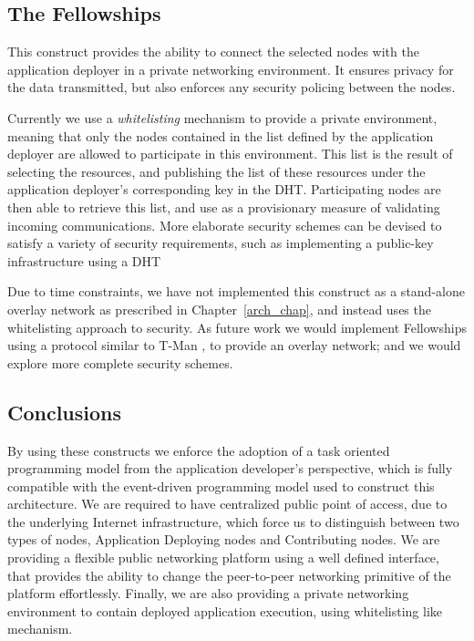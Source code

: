 \documentclass[12pt, titlepage]{uo_temp}
\begin{document}
     \subsection{The Fellowships}
     This construct provides the ability to connect the selected nodes
     with the application deployer in a private networking environment. It ensures privacy
     for the data transmitted, but also enforces any security policing between the nodes. 

     Currently we use a \emph{whitelisting} mechanism to provide a private environment,
     meaning that only the nodes contained in the list defined by the application deployer
     are allowed to participate in this environment. This list is the result of selecting
     the resources, and publishing the list of these resources under the application
     deployer's corresponding key in the DHT.
     Participating nodes are then able to retrieve this list, and use as a provisionary
     measure of validating incoming communications. More elaborate security schemes can be
     devised to satisfy a variety of security requirements, such as implementing a public-key
     infrastructure using a DHT \cite{luo2011self}
     
     Due to time constraints, we have not implemented this construct as a stand-alone
     overlay network as prescribed in Chapter~\ref{arch_chap}, and instead uses the
     whitelisting approach to security. As future work we would implement Fellowships
     using a protocol similar to T-Man \cite{jelasity2009t}, to provide an overlay
     network; and we would explore more complete security schemes.

     \subsection{Conclusions}
     By using these constructs we enforce the adoption of a task oriented programming
     model from the application developer's perspective, which is fully compatible with
     the event-driven programming model used to construct this architecture. We are
     required to have centralized public point of access, due to the underlying Internet
     infrastructure, which force us to distinguish between two types of nodes, Application
     Deploying nodes and Contributing nodes. We are providing a flexible public networking
     platform using a well defined interface, that provides the ability to change the
     peer-to-peer networking primitive of the platform effortlessly. Finally, we are also
     providing a private networking environment to contain deployed application execution,
     using whitelisting like mechanism.
\end{document}
